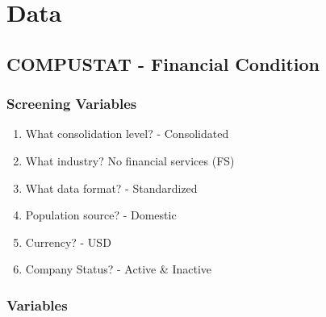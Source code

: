 \documentclass[12pt]{article}
\begin{document}
\section{Data}

    \subsection{COMPUSTAT - Financial Condition}
    
     \subsubsection{Screening Variables}

        \begin{enumerate}
            \item What consolidation level? - Consolidated
            \item What industry? No financial services (FS) 
            \item What data format?  - Standardized 
            \item Population source? - Domestic 
            \item Currency? - USD 
            \item Company Status? - Active \& Inactive  
        \end{enumerate}

    \subsubsection{Variables}
\end{document}
